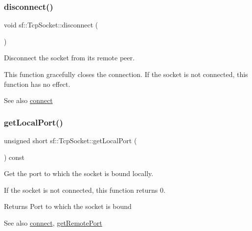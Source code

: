 \subsubsection{\texorpdfstring{disconnect()}{disconnect()}}
{\footnotesize\ttfamily void sf\+::\+Tcp\+Socket\+::disconnect (\begin{DoxyParamCaption}{ }\end{DoxyParamCaption})}



Disconnect the socket from its remote peer. 

This function gracefully closes the connection. If the socket is not connected, this function has no effect.

\begin{DoxySeeAlso}{See also}
\hyperlink{classsf_1_1_tcp_socket_a68cd42d5ab70ab54b16787f555951c40}{connect} 
\end{DoxySeeAlso}
\mbox{\label{classsf_1_1_tcp_socket_a98e45f0f49af1fd99216b9195e86d86b}} 
\subsubsection{\texorpdfstring{get\+Local\+Port()}{getLocalPort()}}
{\footnotesize\ttfamily unsigned short sf\+::\+Tcp\+Socket\+::get\+Local\+Port (\begin{DoxyParamCaption}{ }\end{DoxyParamCaption}) const}



Get the port to which the socket is bound locally. 

If the socket is not connected, this function returns 0.

\begin{DoxyReturn}{Returns}
Port to which the socket is bound
\end{DoxyReturn}
\begin{DoxySeeAlso}{See also}
\hyperlink{classsf_1_1_tcp_socket_a68cd42d5ab70ab54b16787f555951c40}{connect}, \hyperlink{classsf_1_1_tcp_socket_a93bced0afd4b1c60797a85725be04951}{get\+Remote\+Port} 
\end{DoxySeeAlso}
\mbox{\label{classsf_1_1_tcp_socket_aa8579c203b1fd21beb74d7f76444a94c}} 
